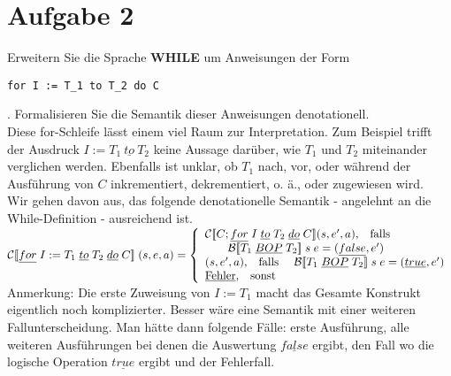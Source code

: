 \documentclass[ngerman,a4paper]{report}
\begin{document}
\section*{Aufgabe 2}
Erweitern Sie die Sprache \textbf{WHILE} um Anweisungen der Form
\begin{lstlisting}
for I := T_1 to T_2 do C
\end{lstlisting}.
Formalisieren Sie die Semantik dieser Anweisungen denotationell.\\
%
%
%
%
Diese for-Schleife lässt einem viel Raum zur Interpretation. Zum Beispiel trifft der Ausdruck $I:=T_1\ \underline{to}\ T_2$ keine Aussage darüber, wie $T_1$ und $T_2$ miteinander verglichen werden. Ebenfalls ist unklar, ob $T_1$ nach, vor, oder während der Ausführung von $C$ inkrementiert, dekrementiert, o. ä., oder zugewiesen wird.\\
Wir gehen davon aus, das folgende denotationelle Semantik - angelehnt an die While-Definition - ausreichend ist.\\
$		\mathcal{C}
[\![\underline{for}\;I:=T_1\;\underline{to}\;T_2\;\underline{do}\;C]\!]\;(s,e,a) = \left\lbrace\begin{array}{l l} \mathcal{C}
[\![C;\underline{for}\;I\;\underline{to}\;T_2\;\underline{do}\;C]\!](s,e',a)\text{,}\quad\text{falls }\\\quad\quad\mathcal{B}
[\![T_1\;\underline{BOP}\;T_2]\!]\;s\;e= (\underline{false},e')\\
(s,e',a)\text{,}\quad\text{falls }\quad\mathcal{B}[\![T_1\;\underline{BOP}\;T_2]\!]\;s\;e= (\underline{true},e')\\
		\underline{\text{Fehler}}\text{,}\quad\text{sonst} \end{array}\right.$\\
Anmerkung: Die erste Zuweisung von $I:=T_1$ macht das Gesamte Konstrukt eigentlich noch komplizierter. Besser wäre eine Semantik mit einer weiteren Fallunterscheidung. Man hätte dann folgende Fälle: erste Ausführung, alle weiteren Ausführungen bei denen die Auswertung $\underline{false}$ ergibt, den Fall wo die logische Operation $\underline{true}$ ergibt und der Fehlerfall.\\
\end{document}
